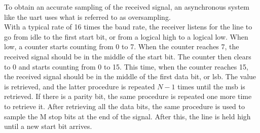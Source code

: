 \documentclass[main.tex]{subfiles}
\begin{document}
To obtain an accurate sampling of the received signal, an asynchronous system like the \gls{uart} uses what is referred to as oversampling. \\
With a typical rate of 16 times the baud rate, the receiver listens for the line to go from idle to the first start bit, or from a logical high to a logical low. When low, a counter starts counting from 0 to 7. When the counter reaches 7, the received signal should be in the middle of the start bit. The counter then clears to 0 and starts counting from 0 to 15. This time, when the counter reaches 15, the received signal should be in the middle of the first data bit, or \acrshort{lsb}. The value is retrieved, and the latter procedure is repeated $N - 1$ times until the \acrshort{msb} is retrieved.
If there is a parity bit, the same procedure is repeated one more time to retrieve it. After retrieving all the data bits, the same procedure is used to sample the M stop bits at the end of the signal. After this, the line is held high until a new start bit arrives. 

\end{document}
